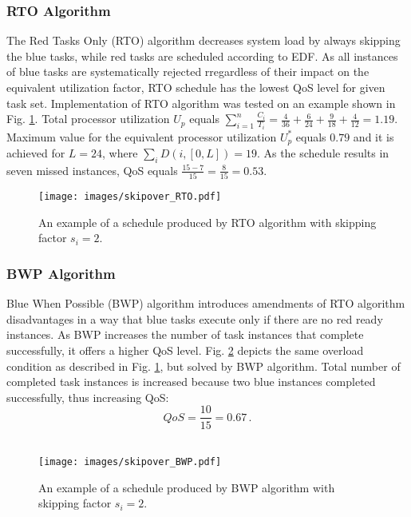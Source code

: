 \subsubsection{RTO Algorithm}
The Red Tasks Only (RTO) algorithm decreases system load by always skipping the blue tasks, while red tasks are scheduled according to EDF. 
As all instances of blue tasks are systematically rejected rregardless of their impact on the equivalent utilization factor, RTO schedule has the lowest QoS level for given task set.
Implementation of RTO algorithm was tested on an example shown in 
Fig. \ref{rto}.
Total processor utilization $U_p$ equals
$\sum_{i=1}^{n}\frac{C_i}{T_i} = \frac{4}{36} + \frac{6}{24} + \frac{9}{18} + \frac{4}{12} = 1.19.$
Maximum value for the equivalent processor utilization $U_p^\ast$ equals $0.79$ and it is achieved for $L = 24$, where $\sum_{i}D(i, [0, L]) = 19$.
As the schedule results in seven missed instances, QoS equals
$\frac{15 - 7}{15} = \frac{8}{15} = 0.53.$

\begin{figure}[ht]
    \centering
    \texttt{[image: images/skipover\_RTO.pdf]}
    \caption{An example of a schedule produced by RTO algorithm with skipping factor $s_i=2$.}
    \label{rto}
\end{figure}

\subsubsection{BWP Algorithm}
Blue When Possible (BWP) algorithm introduces amendments of RTO algorithm disadvantages in a way that blue tasks execute only if there are no red ready instances.
As BWP increases the number of task instances that complete successfully, it offers a higher QoS level. 
Fig. \ref{bwp} depicts the same overload condition as described in Fig. 
\ref{rto}, but solved by BWP algorithm. 
Total number of completed task instances is increased because two blue instances completed successfully, thus increasing QoS:
\begin{equation*}
QoS = \frac{10}{15} = 0.67 \, .
\end{equation*}
\\
\begin{figure}[ht]
    \centering
    \texttt{[image: images/skipover\_BWP.pdf]}
    \caption{An example of a schedule produced by BWP algorithm with skipping factor $s_i=2$.}
    \label{bwp}
\end{figure}

